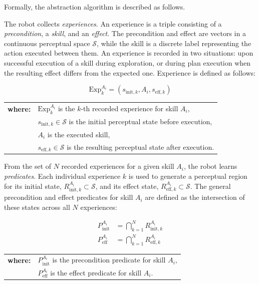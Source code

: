 Formally, the abstraction algorithm is described as follows.

The robot collects \textit{experiences}. An experience is a triple consisting of a \textit{precondition}, a \textit{skill}, and an \textit{effect}. The precondition and effect are vectors in a continuous perceptual space $\mathcal{S}$, while the skill is a discrete label representing the action executed between them. An experience is recorded in two situations: upon successful execution of a skill during exploration, or during plan execution when the resulting effect differs from the expected one. Experience is defined as follows:

\begin{equation} \label{eq:experience}
    \text{Exp}_k^{A_i} = (s_{\text{init}, k}, A_i, s_{\text{eff}, k})
\end{equation}
\noindent\small
\begin{tabularx}{\textwidth}{@{}l@{\hskip 6pt}X}
    \textbf{where:} & $\text{Exp}_k^{A_i}$ is the $k$-th recorded experience for skill $A_i$, \\
                    & $s_{\text{init}, k} \in \mathcal{S}$ is the initial perceptual state before execution, \\
                    & $A_i$ is the executed skill, \\
                    & $s_{\text{eff}, k} \in \mathcal{S}$ is the resulting perceptual state after execution.
\end{tabularx}
\normalsize

From the set of $N$ recorded experiences for a given skill $A_i$, the robot learns \textit{predicates}. Each individual experience $k$ is used to generate a perceptual region for its initial state, $R_{\text{init}, k}^{A_i} \subset \mathcal{S}$, and its effect state, $R_{\text{eff}, k}^{A_i} \subset \mathcal{S}$. The general precondition and effect predicates for skill $A_i$ are defined as the intersection of these states across all $N$ experiences:

\begin{align}
    P_{\text{init}}^{A_i} &= \bigcap_{k=1}^{N} R_{\text{init}, k}^{A_i} \label{eq:pred_init} \\
    P_{\text{eff}}^{A_i} &= \bigcap_{k=1}^{N} R_{\text{eff}, k}^{A_i} \label{eq:pred_eff}
\end{align}
\noindent\small
\begin{tabularx}{\textwidth}{@{}l@{\hskip 6pt}X}
    \textbf{where:} & $P_{\text{init}}^{A_i}$ is the precondition predicate for skill $A_i$, \\
                    & $P_{\text{eff}}^{A_i}$ is the effect predicate for skill $A_i$.
\end{tabularx}
\normalsize

